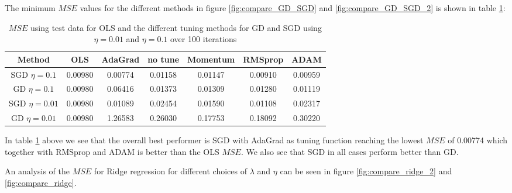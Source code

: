 \documentclass[11pt]{article}
\begin{document}
The minimum $MSE$ values for the different methods in figure \ref{fig:compare_GD_SGD} and \ref{fig:compare_GD_SGD_2} is shown in table \ref{tab:OLS_compare}:
\begin{table}[H]
    \centering
    \caption{$MSE$ using test data for OLS and the different tuning methods for GD and SGD using  $\eta=0.01$ and $\eta=0.1$ over 100 iterations}
    \label{tab:OLS_compare}
    \begin{tabular}{|c|c|c|c|c|c|c|}
        \hline
        Method          & OLS     & AdaGrad & no tune & Momentum & RMSprop & ADAM    \\
        \hline
        SGD $\eta=0.1$  & 0.00980 & 0.00774 & 0.01158 & 0.01147  & 0.00910 & 0.00959 \\
        \hline
        GD  $\eta=0.1$  & 0.00980 & 0.06416 & 0.01373 & 0.01309  & 0.01280 & 0.01119 \\
        \hline
        SGD $\eta=0.01$ & 0.00980 & 0.01089 & 0.02454 & 0.01590  & 0.01108 & 0.02317 \\
        \hline
        GD  $\eta=0.01$ & 0.00980 & 1.26583 & 0.26030 & 0.17753  & 0.18092 & 0.30220 \\
        \hline
    \end{tabular}
\end{table}
In table \ref{tab:OLS_compare} above we see that the overall best performer is SGD with AdaGrad as tuning function reaching the lowest $MSE$ of 0.00774 which together with RMSprop and ADAM is better than the OLS $MSE$. We also see that SGD in all cases perform better than GD.

An analysis of the $MSE$ for Ridge regression for different choices of $\lambda$ and $\eta$ can be seen in figure  \ref{fig:compare_ridge_2} and \ref{fig:compare_ridge}.
\end{document}

